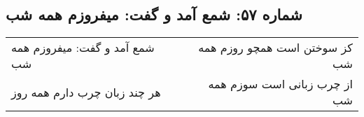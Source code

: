 \begin{center}
\section*{شماره ۵۷: شمع آمد و گفت: میفروزم همه شب}
\label{sec:057}
\begin{longtable}{l p{0.5cm} r}
شمع آمد و گفت: میفروزم همه شب
&&
کز سوختن است همچو روزم همه شب
\\
هر چند زبان چرب دارم همه روز
&&
از چرب زبانی است سوزم همه شب
\\
\end{longtable}
\end{center}
